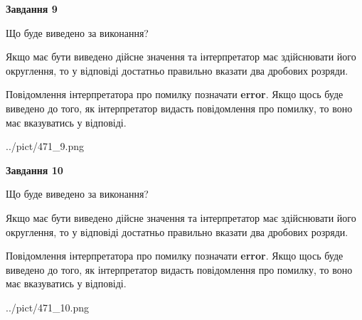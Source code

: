 \documentclass[12pt, ukrainian]{article}
\begin{document}
{\begin {Large}
{\begin {center}\textbf{Завдання 9}\end {center}}\par
Що буде виведено за виконання? \par

Якщо має бути виведено дійсне значення та інтерпретатор має здійснювати його округлення, 
то у відповіді достатньо правильно вказати два дробових розряди.

Повідомлення інтерпретатора про помилку позначати \textbf{error}.
Якщо щось буде виведено до того, як інтерпретатор видасть повідомлення про помилку, 
то воно має вказуватись у відповіді. \par

\begin{center}
	{../pict/471_9.png}
\end{center}
\newpage

{\begin {center}\textbf{Завдання 10}\end {center}}\par
Що буде виведено за виконання? \par

Якщо має бути виведено дійсне значення та інтерпретатор має здійснювати його округлення, 
то у відповіді достатньо правильно вказати два дробових розряди.

Повідомлення інтерпретатора про помилку позначати \textbf{error}.
Якщо щось буде виведено до того, як інтерпретатор видасть повідомлення про помилку, 
то воно має вказуватись у відповіді. \par

\begin{center}
	{../pict/471_10.png}
\end{center}
\newpage

\end {Large}}
\end{document}
